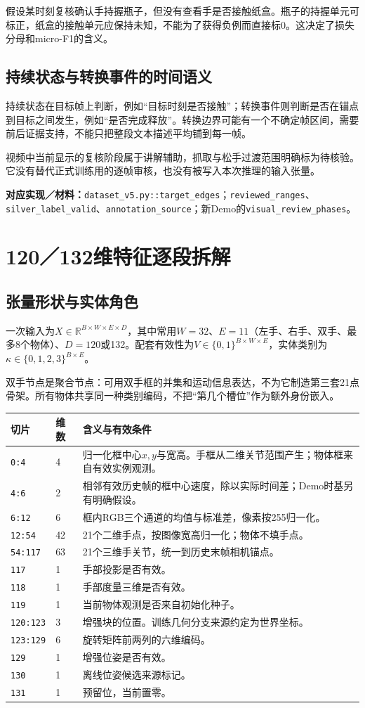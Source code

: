 \documentclass[11pt,a4paper,UTF8,fontset=fandol]{ctexart}
\newcommand{\code}[1]{{\small\nolinkurl{#1}}}
\newcommand{\where}[1]{\par{\small\color{green}\textbf{对应实现／材料：}#1}\par}
\begin{document}
假设某时刻复核确认手持握瓶子，但没有查看手是否接触纸盒。瓶子的持握单元可标正，纸盒的接触单元应保持未知，不能为了获得负例而直接标0。这决定了损失分母和micro-F1的含义。

\subsection{持续状态与转换事件的时间语义}
持续状态在目标帧上判断，例如“目标时刻是否接触”；转换事件则判断是否在锚点到目标之间发生，例如“是否完成释放”。转换边界可能有一个不确定帧区间，需要前后证据支持，不能只把整段文本描述平均铺到每一帧。

视频中当前显示的复核阶段属于讲解辅助，抓取与松手过渡范围明确标为待核验。它没有替代正式训练用的逐帧审核，也没有被写入本次推理的输入张量。
\where{\code{dataset_v5.py::target_edges}；\code{reviewed_ranges}、\code{silver_label_valid}、\code{annotation_source}；新Demo的\code{visual_review_phases}。}

\section{120／132维特征逐段拆解}
\subsection{张量形状与实体角色}
一次输入为$X\in\mathbb R^{B\times W\times E\times D}$，其中常用$W=32$、$E=11$（左手、右手、双手、最多8个物体）、$D=120$或132。配套有效性为$V\in\{0,1\}^{B\times W\times E}$，实体类别为$\kappa\in\{0,1,2,3\}^{B\times E}$。

双手节点是聚合节点：可用双手框的并集和运动信息表达，不为它制造第三套21点骨架。所有物体共享同一种类别编码，不把“第几个槽位”作为额外身份嵌入。

\begin{longtable}{p{2.1cm}p{2.5cm}p{8.8cm}}
\toprule 切片 & 维数 & 含义与有效条件\\\midrule\endhead
\code{0:4} & 4 & 归一化框中心$x,y$与宽高。手框从二维关节范围产生；物体框来自有效实例观测。\\
\code{4:6} & 2 & 相邻有效历史帧的框中心速度，除以实际时间差；Demo时基另有明确假设。\\
\code{6:12} & 6 & 框内RGB三个通道的均值与标准差，像素按255归一化。\\
\code{12:54} & 42 & 21个二维手点，按图像宽高归一化；物体不填手点。\\
\code{54:117} & 63 & 21个三维手关节，统一到历史末帧相机锚点。\\
\code{117} & 1 & 手部投影是否有效。\\
\code{118} & 1 & 手部度量三维是否有效。\\
\code{119} & 1 & 当前物体观测是否来自初始化种子。\\
\code{120:123} & 3 & 增强块的位置。训练几何分支来源约定为世界坐标。\\
\code{123:129} & 6 & 旋转矩阵前两列的六维编码。\\
\code{129} & 1 & 增强位姿是否有效。\\
\code{130} & 1 & 离线位姿候选来源标记。\\
\code{131} & 1 & 预留位，当前置零。\\\bottomrule
\end{longtable}
\end{document}
